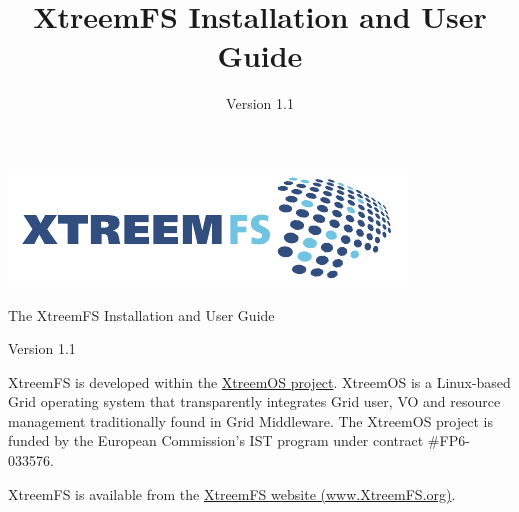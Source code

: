 \documentclass[a4paper,10pt]{book}
\title{XtreemFS Installation and User Guide}
\date{Version 1.1}
\begin{document}
\begin{titlepage}
\begin{flushright}
 \includegraphics{images/final_logo.pdf}
\end{flushright}

\vspace{3cm}

\begin{flushleft}
\sffamily \begin{LARGE}The XtreemFS Installation and User Guide\end{LARGE}

Version 1.1
\end{flushleft}


\end{titlepage}
\garamond
{}

XtreemFS is developed within the \href{http://www.xtreemos.eu}{XtreemOS project}. XtreemOS is a Linux-based Grid operating system that transparently integrates Grid user, VO and resource management traditionally found in Grid Middleware. The XtreemOS project is funded by the European Commission's IST program under contract \#FP6-033576.

XtreemFS is available from the \href{http://www.XtreemFS.org}{XtreemFS website (www.XtreemFS.org)}.
\end{document}
